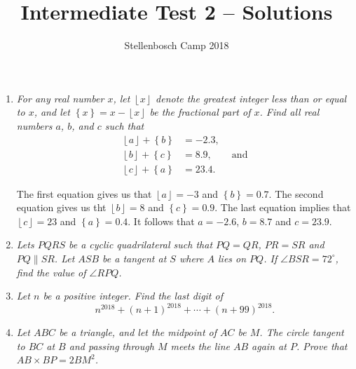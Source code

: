 \documentclass{article}
\title{Intermediate Test 2 -- Solutions}
\author{Stellenbosch Camp 2018}
\date{\vspace{-12pt}}
\newcommand{\floor}[1]{\ensuremath{\left\lfloor#1\right\rfloor}}
\newcommand{\fracpart}[1]{\ensuremath{\left\{#1\right\}}}
\begin{document}
\maketitle

\begin{enumerate}

\item %
\textit{For any real number $x$, let $\floor{x}$ denote the greatest integer less than or equal to $x$, and let $\fracpart{x} = x -\floor{x}$ be the fractional part of $x$. Find all real numbers $a$, $b$, and $c$ such that
\begin{align*}
  \floor{a} +\fracpart{b} &= -2.3, \\
  \floor{b} +\fracpart{c} &= 8.9, \qquad \mathrm{and}\\
  \floor{c} +\fracpart{a} &= 23.4.
\end{align*}}

The first equation gives us that $\floor{a} = -3$ and $\fracpart{b} = 0.7$. The second equation gives us tht $\floor{b} = 8$ and $\fracpart{c} = 0.9$. The last equation implies that $\floor{c} = 23$ and $\fracpart{a} = 0.4$. It follows that $a = -2.6$, $b = 8.7$ and $c = 23.9$.


\vspace{12pt}
\item %
\textit{Lets $PQRS$ be a cyclic quadrilateral such that $PQ = QR$, $PR = SR$ and $PQ \parallel SR$. Let $ASB$ be a tangent at $S$ where $A$ lies on $PQ$. If $\angle BSR = 72^{\circ}$, find the value of $\angle RPQ$.}


\vspace{12pt}
\item %
\textit{Let $n$ be a positive integer. Find the last digit of \[ n^{2018} +(n+1)^{2018} +\dotsb +(n+99)^{2018}. \]}


\vspace{12pt}
\item %
\textit{Let $ABC$ be a triangle, and let the midpoint of $AC$ be $M$. The circle tangent to $BC$ at $B$ and passing through $M$ meets the line $AB$ again at $P$. Prove that $AB \times BP = 2 BM^2$.}

\begin{figure}[H]
\begin{center}
\end{center}		
\end{figure}


\end{enumerate}
\end{document}
